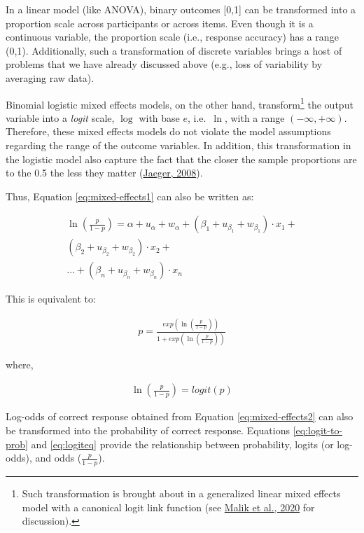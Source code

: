 \documentclass[a4paper, nobind]{templates/ociamthesis}
\begin{document}
In a linear model (like ANOVA), binary outcomes {[}0,1{]} can be transformed into a proportion scale across participants or across items.
Even though it is a continuous variable, the proportion scale (i.e., response accuracy) has a range (0,1).
Additionally, such a transformation of discrete variables brings a host of problems that we have already discussed above (e.g., loss of variability by averaging raw data).

Binomial logistic mixed effects models, on the other hand, transform\footnote{Such transformation is brought about in a generalized linear mixed effects model with a canonical logit link function (see \protect\hyperlink{ref-Malik2020}{Malik et al., 2020} for discussion).} the output variable into a \emph{logit} scale, \(\log\) with base \(e\), i.e.~\(\ln\), with a range \((-\infty, +\infty)\).
Therefore, these mixed effects models do not violate the model assumptions regarding the range of the outcome variables.
In addition, this transformation in the logistic model also capture the fact that the closer the sample proportions are to the 0.5 the less they matter (\protect\hyperlink{ref-Jaeger2008}{Jaeger, 2008}).

Thus, Equation \eqref{eq:mixed-effects1} can also be written as:

\begin{align} \label{eq:mixed-effects2}
\ln (\frac{p}{1-p}) = \alpha + u_{\alpha} + w_{\alpha} +
                      (\beta_{1} + u_{\beta_{1}} + w_{\beta_{1}})\cdot {x_1} + \nonumber\\
                      (\beta_{2} + u_{\beta_{2}} + w_{\beta_{2}})\cdot {x_2} + \nonumber\\
                      ... + (\beta_{n} + u_{\beta_{n}} + w_{\beta_{n}})\cdot {x_n} 
\end{align}

This is equivalent to:

\begin{align} \label{eq:logit-to-prob}
p = {\frac{exp(\ln(\frac{p}{1-p}))}{1 + exp (\ln(\frac{p}{1-p}))}}
\end{align}

where,

\begin{align} \label{eq:logiteq}
\ln(\frac{p}{1-p}) =
{logit}(p)
\end{align}

Log-odds of correct response obtained from Equation \eqref{eq:mixed-effects2} can also be transformed into the probability of correct response.
Equations \eqref{eq:logit-to-prob} and \eqref{eq:logiteq} provide the relationship between probability, logits (or log-odds), and odds (\(\frac{p}{1-p}\)).
\end{document}
